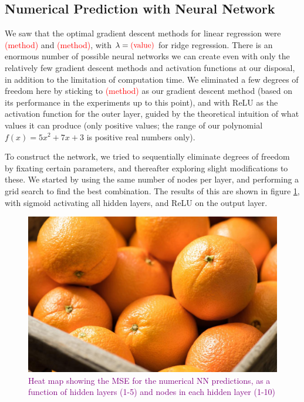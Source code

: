 \subsection{Numerical Prediction with Neural Network}
We saw that the optimal gradient descent methods for linear regression were \textcolor{red}{(method)} and \textcolor{red}{(method)}, with $\lambda = \text{\textcolor{red}{(value)}}$ for ridge regression. There is an enormous number of possible neural networks we can create even with only the relatively few gradient descent methods and activation functions at our disposal, in addition to the limitation of computation time. We eliminated a few degrees of freedom here by sticking to \textcolor{red}{(method)} as our gradient descent method (based on its performance in the experiments up to this point), and with ReLU as the activation function for the outer layer, guided by the theoretical intuition of what values it can produce (only positive values; the range of our polynomial $f(x) = 5x^2 + 7x + 3$ is positive real numbers only).

To construct the network, we tried to sequentially eliminate degrees of freedom by fixating certain parameters, and thereafter exploring slight modifications to these. We started by using the same number of nodes per layer, and performing a grid search to find the best combination. The results of this are shown in figure \ref{fig:gridsearch_numpred_layers_nodes}, with sigmoid activating all hidden layers, and ReLU on the output layer.
\begin{figure}
    \centering
    \includegraphics[width=0.5\linewidth]{figures/placeholders/gridsearch_numpred_layers_nodes.png}
    \caption{\textcolor{purple}{Heat map showing the MSE for the numerical NN predictions, as a function of hidden layers (1-5) and nodes in each hidden layer (1-10)}}
    \label{fig:gridsearch_numpred_layers_nodes}
\end{figure}

